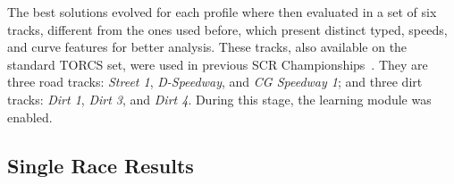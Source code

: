 
The best solutions evolved for each profile where then evaluated in a set of six tracks, different from the ones used before, which present distinct typed, speeds, and curve features for better analysis. These tracks, also available on the standard TORCS set, were used in previous SCR Championships~\cite{AUTOPIA2009}. They are three road tracks: \emph{Street 1}, \emph{D-Speedway}, and \emph{CG Speedway 1}; and three dirt tracks: \emph{Dirt 1}, \emph{Dirt 3}, and \emph{Dirt 4}. During this stage, the learning module was enabled.



\subsection{Single Race Results}

